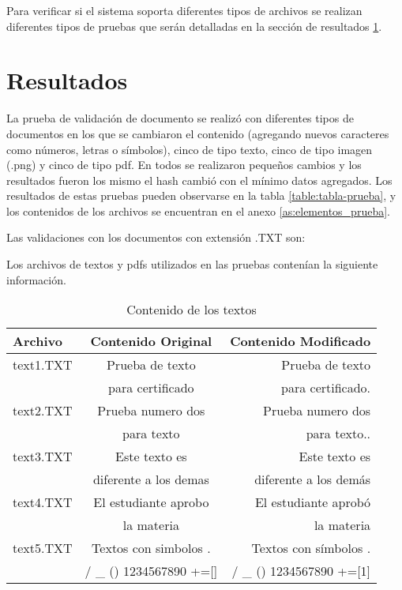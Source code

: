 Para verificar si el sistema soporta diferentes tipos de archivos se realizan diferentes tipos de 
pruebas que serán detalladas en la sección de resultados \ref{s:resultados}.



\section{Resultados}\label{s:resultados}


La prueba de validación de documento se realizó con diferentes tipos de documentos en los que se cambiaron el contenido (agregando nuevos 
caracteres como números, letras o símbolos), cinco de tipo texto, cinco de tipo imagen (.png) y cinco de tipo pdf. En todos se realizaron pequeños 
cambios y los resultados
fueron los mismo el hash cambió con el mínimo datos agregados. 
Los resultados de estas pruebas pueden observarse en la tabla \ref{table:tabla-prueba}, y los contenidos de los archivos se encuentran en el anexo \ref{as:elementos_prueba}.

Las validaciones con  los documentos con extensión .TXT son:

Los archivos de textos y pdfs utilizados en las pruebas contenían la siguiente información.
    \begin{table}[H]
    \centering
    \begin{tabular}{ |l|c|r| }
    \hline
    Archivo & Contenido Original & Contenido Modificado \\
    \hline
    text1.TXT & Prueba de texto  & Prueba de texto  \\
              &  para certificado & para certificado. \\
    \hline
    text2.TXT & Prueba numero dos  & Prueba numero dos  \\
              &  para texto & para texto.. \\
    \hline
    text3.TXT & Este texto es          & Este texto es  \\
              &  diferente a los demas & diferente a los demás \\
    \hline
    text4.TXT & El estudiante aprobo  & El estudiante aprobó  \\
     & la materia & la materia \\
    \hline
    text5.TXT & Textos con simbolos .  & Textos con símbolos .  \\
     &  / \_ () 1234567890 +=[] & / \_ () 1234567890 +=[1] \\
    \hline
    \end{tabular}
    \caption{Contenido de los textos}
    \label{table:tabla-textos-prueba}
    \end{table}


